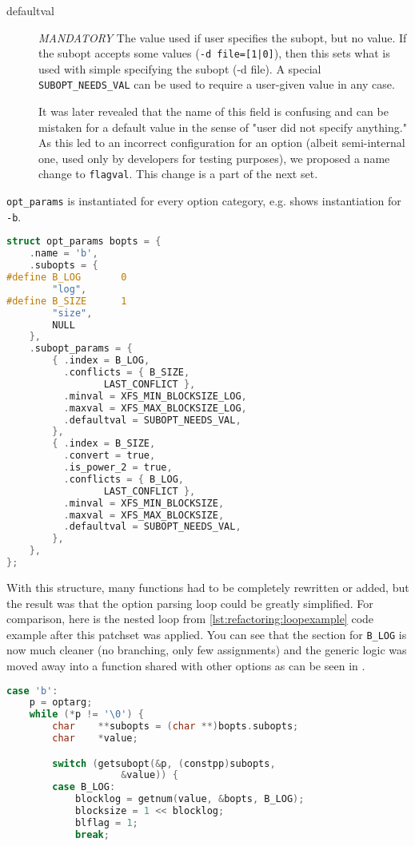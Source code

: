 \begin{description}
\item[defaultval] {\em MANDATORY}
    The value used if user specifies the subopt, but no value.
    If the subopt accepts some values ({\tt -d file=[1|0]}), then this
    sets what is used with simple specifying the subopt (-d file).
    A special {\tt SUBOPT\_NEEDS\_VAL} can be used to require a user-given
    value in any case.

    It was later revealed that the name of this field is confusing and can
    be mistaken for a default value in the sense of "user did not specify
    anything." As this led to an incorrect configuration for an option
    (albeit semi-internal one, used only by developers for testing
    purposes), we proposed a name change to {\tt flagval}. This change is a
    part of the next set.
		
\end{description}

{\tt opt\_params} is instantiated for every option category, e.g.
 shows instantiation for {\tt
-b}.

\begin{lstlisting}[frame=none, basicstyle=\footnotesize\ttfamily,
language=C, numbers=none, numberstyle=\tiny\color{black},
caption= {Instantiation of the table for block options.},
label={lst:refactoring:instantiation}]
struct opt_params bopts = {
	.name = 'b',
	.subopts = {
#define	B_LOG		0
		"log",
#define	B_SIZE		1
		"size",
		NULL
	},
	.subopt_params = {
		{ .index = B_LOG,
		  .conflicts = { B_SIZE,
				 LAST_CONFLICT },
		  .minval = XFS_MIN_BLOCKSIZE_LOG,
		  .maxval = XFS_MAX_BLOCKSIZE_LOG,
		  .defaultval = SUBOPT_NEEDS_VAL,
		},
		{ .index = B_SIZE,
		  .convert = true,
		  .is_power_2 = true,
		  .conflicts = { B_LOG,
				 LAST_CONFLICT },
		  .minval = XFS_MIN_BLOCKSIZE,
		  .maxval = XFS_MAX_BLOCKSIZE,
		  .defaultval = SUBOPT_NEEDS_VAL,
		},
	},
};
\end{lstlisting}

With this structure, many functions had to be completely rewritten or
added, but the result was that the option parsing loop could be greatly
simplified. For comparison, here is the nested loop from
\ref{lst:refactoring:loopexample} code example after this patchset was
applied. You can see that the section for {\tt B\_LOG} is now much cleaner
(no branching, only few assignments) and the generic logic was moved away
into a function shared with other options as can be seen in
.

\begin{lstlisting}[frame=none, basicstyle=\footnotesize\ttfamily,
language=C, numbers=none, numberstyle=\tiny\color{black},
caption= {Part of option-parsing loop from mkfs.xfs after the first patch
set.},
label={lst:refactoring:parsingAfterFirst}]
case 'b':
	p = optarg;
	while (*p != '\0') {
		char	**subopts = (char **)bopts.subopts;
		char	*value;

		switch (getsubopt(&p, (constpp)subopts,
					&value)) {
		case B_LOG:
			blocklog = getnum(value, &bopts, B_LOG);
			blocksize = 1 << blocklog;
			blflag = 1;
			break;
\end{lstlisting}

